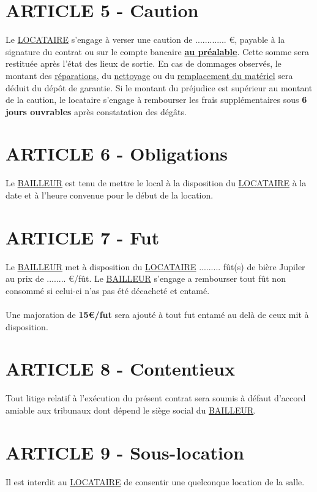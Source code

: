 \documentclass{article}
\begin{document}
\newpage

\section*{ARTICLE 5 - Caution}
Le \underline{LOCATAIRE} s’engage à verser une caution de ............. €, payable à la signature du contrat ou sur le compte bancaire \textbf{\underline{au préalable}}. Cette somme sera restituée après l’état des lieux de sortie. En cas de dommages observés, le montant des \underline{réparations}, du \underline{nettoyage} ou du \underline{remplacement du matériel} sera déduit du dépôt de garantie. Si le montant du préjudice est supérieur au montant de la caution, le locataire s’engage à rembourser les frais supplémentaires sous \textbf{6 jours ouvrables} après constatation des dégâts.

\section*{ARTICLE 6 - Obligations}
Le \underline{BAILLEUR} est tenu de mettre le local à la disposition du \underline{LOCATAIRE} à la date et à l’heure convenue pour le début de la location.

\section*{ARTICLE 7 - Fut}
Le \underline{BAILLEUR} met à disposition du \underline{LOCATAIRE} ......... fût(s) de bière Jupiler au prix de ........ €/fût. Le \underline{BAILLEUR} s'engage a rembourser tout fût non consommé si celui-ci n'as pas été décacheté et entamé.\\\\
Une majoration de \textbf{15€/fut} sera ajouté à tout fut entamé au delà de ceux mit à disposition.

\section*{ARTICLE 8 - Contentieux}
Tout litige relatif à l’exécution du présent contrat sera soumis à défaut d’accord amiable aux tribunaux dont dépend le siège social du \underline{BAILLEUR}.

\section*{ARTICLE 9 - Sous-location}
Il est interdit au \underline{LOCATAIRE} de consentir une quelconque location de la salle.
\end{document}
